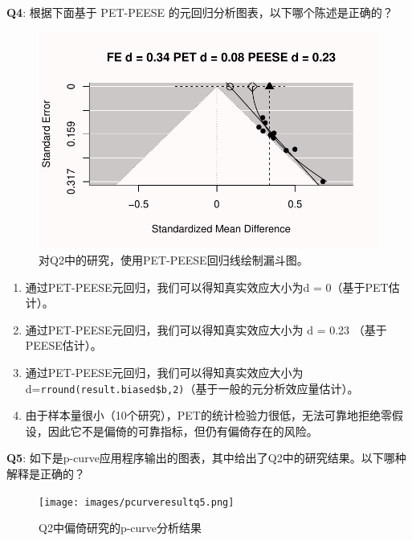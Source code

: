 \documentclass[
  letterpaper,
  DIV=11,
  numbers=noendperiod]{scrreprt}
\providecommand{\tightlist}{%
  \setlength{\itemsep}{0pt}\setlength{\parskip}{0pt}}\usepackage{longtable,booktabs,array}
\begin{document}
\textbf{Q4}: 根据下面基于 PET-PEESE
的元回归分析图表，以下哪个陈述是正确的？

\begin{figure}

{\centering \includegraphics[width=1\textwidth,height=\textheight]{12-bias_files/figure-pdf/fig-petpeeseq4-1.pdf}

}

\caption{\label{fig-petpeeseq4}对Q2中的研究，使用PET-PEESE回归线绘制漏斗图。}

\end{figure}

\begin{enumerate}
\def\labelenumi{\Alph{enumi})}
\tightlist
\item
  通过PET-PEESE元回归，我们可以得知真实效应大小为d = 0（基于PET估计）。
\item
  通过PET-PEESE元回归，我们可以得知真实效应大小为 d = 0.23
  （基于PEESE估计）。
\item
  通过PET-PEESE元回归，我们可以得知真实效应大小为d=\texttt{rround(result.biased\$b,2)}（基于一般的元分析效应量估计）。
\item
  由于样本量很小（10个研究），PET的统计检验力很低，无法可靠地拒绝零假设，因此它不是偏倚的可靠指标，但仍有偏倚存在的风险。
\end{enumerate}

\textbf{Q5}:
如下是p-curve应用程序输出的图表，其中给出了Q2中的研究结果。以下哪种解释是正确的？

\begin{figure}

{\centering \texttt{[image: images/pcurveresultq5.png]}

}

\caption{\label{fig-pcurveresultq5}Q2中偏倚研究的p-curve分析结果}

\end{figure}
\end{document}
